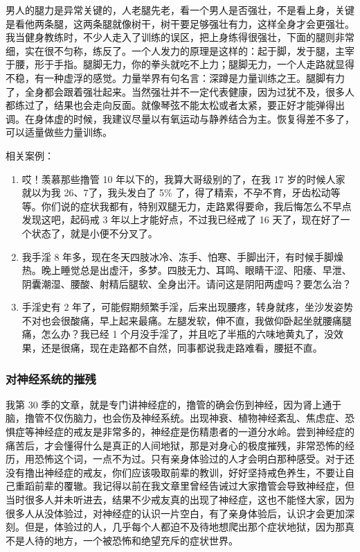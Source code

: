 \documentclass[fontset=founder]{ctexart}
\begin{document}
男人的腿力是异常关键的，人老腿先老，看一个男人是否强壮，不是看上身，关键是看他两条腿，这两条腿就像树干，树干要足够强壮有力，这样全身才会更强壮。我当健身教练时，不少人走入了训练的误区，把上身练得很强壮，下面的腿则非常细，实在很不匀称，练反了。一个人发力的原理是这样的：起于脚，发于腿，主宰于腰，形于手指。腿脚无力，你的拳头就吃不上力；腿脚无力，一个人走路就显得不稳，有一种虚浮的感觉。力量举界有句名言：深蹲是力量训练之王。腿脚有力了，全身都会跟着强壮起来。当然强壮并不一定代表健康，因为过犹不及，很多人都练过了，结果也会走向反面。就像琴弦不能太松或者太紧，要正好才能弹得出调。在身体虚的时候，我建议尽量以有氧运动与静养结合为主。恢复得差不多了，可以适量做些力量训练。

相关案例：

\begin{enumerate}
    \item 哎！羡慕那些撸管 10 年以下的，我算大哥级别的了，在我 17 岁的时候人家就以为我 26、7了，我头发白了 5\% 了，得了精索，不孕不育，牙齿松动等等。你们说的症状我都有，特别双腿无力，走路累得要命，我后悔怎么不早点发现这吧，起码戒 3 年以上才能好点，不过我已经戒了 16 天了，现在好了一个状态了，就是小便不分叉了。
    \item 我手淫 8 年多，现在冬天四肢冰冷、冻手、怕寒、手脚出汗，有时候手脚燥热。晚上睡觉总是出虚汗，多梦。四肢无力、耳鸣、眼睛干涩、阳痿、早泄、阴囊潮湿、腰酸、射精后腿软、全身出汗。请问这是阴阳两虚吗？要怎么治？
    \item 手淫史有 2 年了，可能假期频繁手淫，后来出现腰疼，转身就疼，坐沙发姿势不对也会很酸痛，早上起来最痛。左腿发软，伸不直，我做仰卧起坐就腰痛腿痛，怎么办？我已经 1 个月没手淫了，并且吃了半瓶的六味地黄丸了，没效果，还是很痛，现在走路都不自然，同事都说我走路难看，腰挺不直。
\end{enumerate}

\subsubsection{对神经系统的摧残}

我第 30 季的文章，就是专门讲神经症的，撸管的确会伤到神经，因为肾上通于脑，撸管不仅伤脑力，也会伤及神经系统。出现神衰、植物神经紊乱、焦虑症、恐惧症等神经症的戒友是非常多的，神经症是伤精患者的一道分水岭。尝到神经症的痛苦后，才会懂得什么是真正的人间地狱，那是对身心的极度摧残，非常恐怖的经历，用恐怖这个词，一点不为过。只有亲身体验过的人才会明白那种感受。对于还没有撸出神经症的戒友，你们应该吸取前辈的教训，好好坚持戒色养生，不要让自己重蹈前辈的覆辙。我记得以前在我文章里曾经告诫过大家撸管会导致神经症，但当时很多人并未听进去，结果不少戒友真的出现了神经症，这也不能怪大家，因为很多人从没体验过，对神经症的认识一片空白，有了亲身体验后，认识才会更加深刻。但是，体验过的人，几乎每个人都迫不及待地想爬出那个症状地狱，因为那真不是人待的地方，一个被恐怖和绝望充斥的症状世界。
\end{document}
